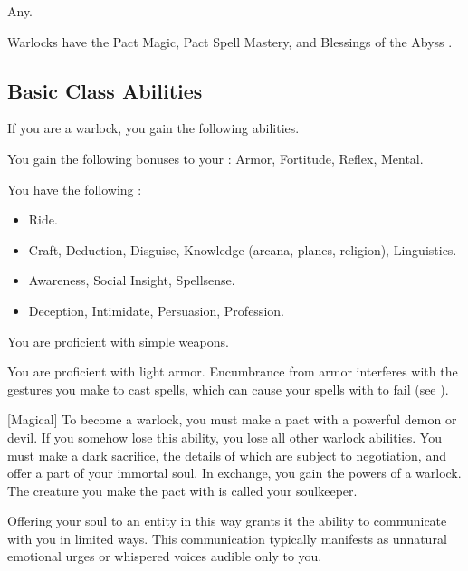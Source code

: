      Any.

     Warlocks have the Pact Magic, Pact Spell Mastery, and Blessings of the Abyss .

    \subsection{Basic Class Abilities}
        If you are a warlock, you gain the following abilities.

        You gain the following bonuses to your :  Armor,  Fortitude,  Reflex,  Mental.

        You have the following :
        \begin{itemize}
            \item {} Ride.
            \item {} Craft, Deduction, Disguise, Knowledge (arcana, planes, religion), Linguistics.
            \item {} Awareness, Social Insight, Spellsense.
            \item {} Deception, Intimidate, Persuasion, Profession.
        \end{itemize}

        You are proficient with simple weapons.

        You are proficient with light armor.
        Encumbrance from armor interferes with the gestures you make to cast spells, which can cause your spells with  to fail (see ).

        [Magical]
        To become a warlock, you must make a pact with a powerful demon or devil.
        If you somehow lose this ability, you lose all other warlock abilities.
        You must make a dark sacrifice, the details of which are subject to negotiation, and offer a part of your immortal soul.
        In exchange, you gain the powers of a warlock.
        The creature you make the pact with is called your soulkeeper.

        Offering your soul to an entity in this way grants it the ability to communicate with you in limited ways.
        This communication typically manifests as unnatural emotional urges or whispered voices audible only to you.


